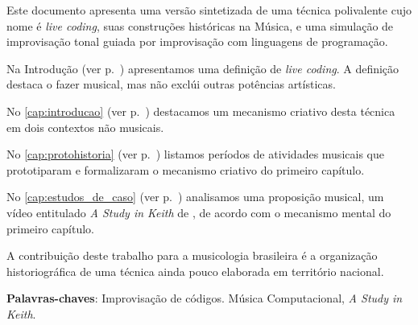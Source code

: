 
\setlength{\absparsep}{18pt} %
\begin{resumo}

Este documento apresenta uma versão sintetizada de uma técnica polivalente cujo nome é \emph{live coding}, suas construções históricas na Música, e uma simulação de improvisação tonal guiada por improvisação com linguagens de programação.

Na Introdução (ver p.~\pageref{cap:intro}) apresentamos uma definição de \emph{live coding}. A definição destaca o fazer musical, mas não exclúi outras potências artísticas. 

No \autoref{cap:introducao} (ver p.~\pageref{cap:introducao}) destacamos um mecanismo criativo desta técnica em dois contextos não musicais.

No \autoref{cap:protohistoria} (ver p.~\pageref{cap:protohistoria}) listamos  períodos de atividades musicais que prototiparam e formalizaram o mecanismo criativo do primeiro capítulo.

No \autoref{cap:estudos_de_caso} (ver p.~\pageref{cap:estudos_de_caso}) analisamos uma proposição musical, 
um vídeo entitulado \emph{A Study in Keith} de , de acordo com o mecanismo mental do primeiro capítulo.

A contribuição deste trabalho para a musicologia brasileira é a organização historiográfica de uma técnica ainda pouco elaborada em território nacional.

\vspace{\onelineskip}
\noindent
\textbf{Palavras-chaves}: Improvisação de códigos. Música Computacional, \emph{A Study in Keith}.
\end{resumo}


